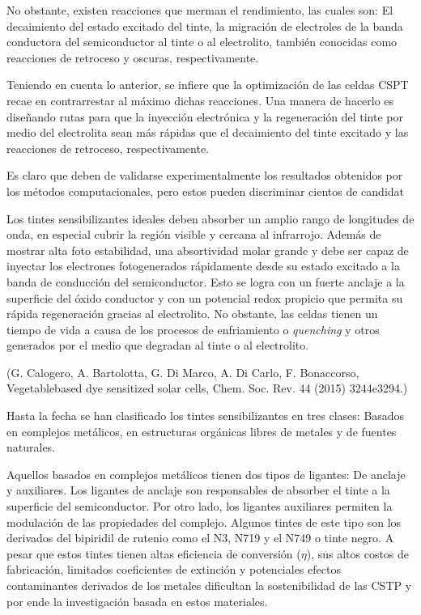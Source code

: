 
No obstante, existen reacciones que merman el rendimiento, las cuales son: El decaimiento del estado excitado del tinte, la migración de electroles de la banda conductora del semiconductor al tinte o al electrolito, también conocidas como reacciones de retroceso y oscuras, respectivamente. 

Teniendo en cuenta lo anterior, se infiere que la optimización de las celdas CSPT recae en contrarrestar al máximo dichas reacciones. Una manera de hacerlo es diseñando rutas para que la inyección electrónica y la regeneración del tinte por medio del electrolita sean más rápidas que el decaimiento del tinte excitado y las reacciones de retroceso, respectivamente. 

Es claro que deben de validarse experimentalmente los resultados obtenidos por los métodos computacionales, pero estos pueden discriminar cientos de candidat



Los tintes sensibilizantes ideales deben absorber un amplio rango de longitudes de onda, en especial cubrir la región visible y cercana al infrarrojo. Además de mostrar alta foto estabilidad, una absortividad molar grande y debe ser capaz de inyectar los electrones fotogenerados rápidamente desde su estado excitado a la banda de conducción del semiconductor. Esto se logra con un fuerte anclaje a la superficie del óxido conductor y con un potencial redox propicio que permita su rápida regeneración gracias al electrolito. No obstante, las celdas tienen un tiempo de vida a causa de los procesos de enfriamiento o \textit{quenching} y otros generados por el medio que degradan al tinte o al electrolito.

(G. Calogero, A. Bartolotta, G. Di Marco, A. Di Carlo, F. Bonaccorso, Vegetablebased
dye sensitized solar cells, Chem. Soc. Rev. 44 (2015) 3244e3294.)

Hasta la fecha se han clasificado los tintes sensibilizantes en tres clases: Basados en complejos metálicos, en estructuras orgánicas libres de metales y de fuentes naturales.

Aquellos basados en complejos metálicos tienen dos tipos de ligantes: De anclaje y auxiliares. Los ligantes de anclaje son responsables de absorber el tinte a la superficie del semiconductor. Por otro lado, los ligantes auxiliares permiten la modulación de las propiedades del complejo. Algunos tintes de este tipo son los derivados del bipiridil de rutenio como el N3, N719 y el N749 o tinte negro. A pesar que estos tintes tienen altas eficiencia de conversión ($\eta$), sus altos costos de fabricación, limitados coeficientes de extinción y potenciales efectos contaminantes derivados de los metales dificultan la sostenibilidad de las CSTP y por ende la investigación basada en estos materiales. 

